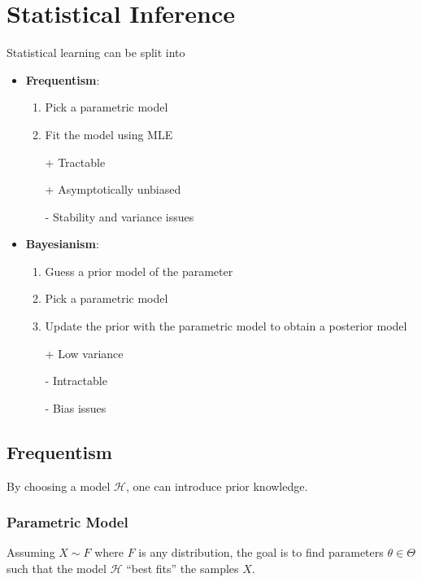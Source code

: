 \section{Statistical Inference}
Statistical learning can be split into
\begin{itemize}
    \item \textbf{Frequentism}:
          \begin{enumerate}
              \item Pick a parametric model
              \item Fit the model using MLE
          \end{enumerate}
          \newpar{}
          \begin{itemize}
              \item[+] Tractable
              \item[+] Asymptotically unbiased
              \item[-] Stability and variance issues
          \end{itemize}
          \newpar{}
    \item \textbf{Bayesianism}:
          \begin{enumerate}
              \item Guess a prior model of the parameter
              \item Pick a parametric model
              \item Update the prior with the parametric model to obtain a posterior model
          \end{enumerate}
          \newpar{}
          \begin{itemize}
              \item[+] Low variance
              \item[-] Intractable
              \item[-] Bias issues
          \end{itemize}
\end{itemize}

\subsection{Frequentism}
By choosing a model $\mathcal{H}$, one can introduce prior knowledge.

\subsubsection{Parametric Model}
Assuming $X\sim F$ where $F$ is any distribution, the goal is to find parameters $\theta\in\Theta$ such that the model $\mathcal{H}$ ``best fits'' the samples $X$.

